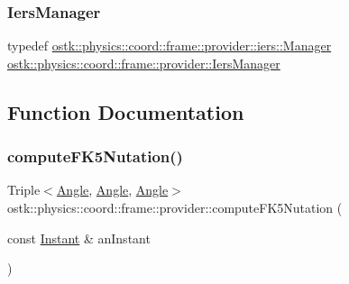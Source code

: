 \subsubsection{\texorpdfstring{Iers\+Manager}{IersManager}}
{\footnotesize\ttfamily typedef \hyperlink{classostk_1_1physics_1_1coord_1_1frame_1_1provider_1_1iers_1_1_manager}{ostk\+::physics\+::coord\+::frame\+::provider\+::iers\+::\+Manager} \hyperlink{namespaceostk_1_1physics_1_1coord_1_1frame_1_1provider_a4a4183a2547e2e41d722a832c7e1c137}{ostk\+::physics\+::coord\+::frame\+::provider\+::\+Iers\+Manager}}



\subsection{Function Documentation}
\mbox{\label{namespaceostk_1_1physics_1_1coord_1_1frame_1_1provider_a0766714124629840ab0b3a909bc6e473}} 
\subsubsection{\texorpdfstring{compute\+F\+K5\+Nutation()}{computeFK5Nutation()}}
{\footnotesize\ttfamily Triple$<$\hyperlink{classostk_1_1physics_1_1units_1_1_angle}{Angle}, \hyperlink{classostk_1_1physics_1_1units_1_1_angle}{Angle}, \hyperlink{classostk_1_1physics_1_1units_1_1_angle}{Angle}$>$ ostk\+::physics\+::coord\+::frame\+::provider\+::compute\+F\+K5\+Nutation (\begin{DoxyParamCaption}\item[{const \hyperlink{classostk_1_1physics_1_1time_1_1_instant}{Instant} \&}]{an\+Instant }\end{DoxyParamCaption})}

\mbox{\label{namespaceostk_1_1physics_1_1coord_1_1frame_1_1provider_acd9c9770d79be89d7c94517df77ebe27}} 
